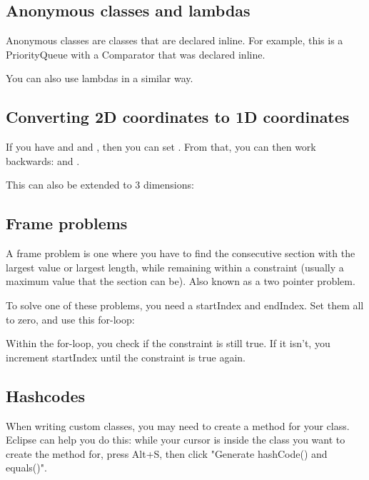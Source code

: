
\subsection*{Anonymous classes and lambdas}

Anonymous classes are classes that are declared inline. For example, this is a PriorityQueue with a Comparator that was declared inline.



You can also use lambdas in a similar way.



\subsection*{Converting 2D coordinates to 1D coordinates}

If you have  and  and , then you can set . From that, you can then work backwards:  and .

This can also be extended to 3 dimensions: 

\subsection*{Frame problems}

A frame problem is one where you have to find the consecutive section with the largest value or largest length, while remaining within a constraint (usually a maximum value that the section can be). Also known as a two pointer problem.

To solve one of these problems, you need a startIndex and endIndex. Set them all to zero, and use this for-loop: 

Within the for-loop, you check if the constraint is still true. If it isn't, you increment startIndex until the constraint is true again.

\subsection*{Hashcodes}

When writing custom classes, you may need to create a  method for your class. Eclipse can help you do this: while your cursor is inside the class you want to create the method for, press Alt+S, then click "Generate hashCode() and equals()".

